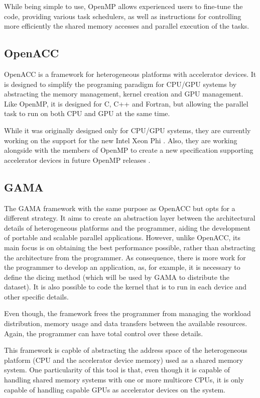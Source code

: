 While being simple to use, OpenMP allows experienced users to fine-tune the code, providing various task schedulers, as well as instructions for controlling more efficiently the shared memory accesses and parallel execution of the tasks.

\subsection{OpenACC}

OpenACC \cite{OpenACC} is a framework for heterogeneous platforms with accelerator devices. It is designed to simplify the programing paradigm for CPU/GPU systems by abstracting the memory management, kernel creation and GPU management. Like OpenMP, it is designed for C, C++ and Fortran, but allowing the parallel task to run on both CPU and GPU at the same time.

While it was originally designed only for CPU/GPU systems, they are currently working on the support for the new Intel Xeon Phi \cite{OpenACC:HPCWire}. Also, they are working alongside with the members of OpenMP to create a new specification supporting accelerator devices in future OpenMP releases \cite{OpenACC:OpenMP}.

\subsection{GAMA}

The GAMA framework \cite{GAMA} with the same purpose as OpenACC but opts for a different strategy. It aims to create an abstraction layer between the architectural details of heterogeneous platforms and the programmer, aiding the development of portable and scalable parallel applications. However, unlike OpenACC, its main focus is on obtaining the best performance possible, rather than abstracting the architecture from the programmer. As consequence, there is more work for the programmer to develop an application, as, for example, it is necessary to define the dicing method (which will be used by GAMA to distribute the dataset). It is also possible to code the kernel that is to run in each device and other specific details.

Even though, the framework frees the programmer from managing the workload distribution, memory usage and data transfers between the available resources. Again, the programmer can have total control over these details.

This framework is capble of abstracting the address space of the heterogeneous platform (CPU and the accelerator device memory) used as a shared memory system. One particularity of this tool is that, even though it is capable of handling shared memory systems with one or more multicore CPUs, it is only capable of handling \cuda capable GPUs as accelerator devices on the system.

